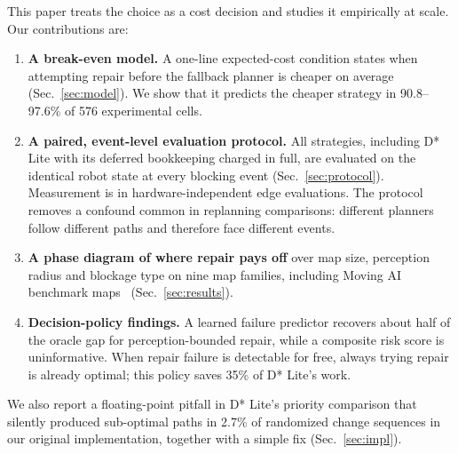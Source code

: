 \documentclass[11pt,a4paper]{article}
\begin{document}
This paper treats the choice as a cost decision and studies it empirically at scale. Our contributions are:
\begin{enumerate}
  \item \textbf{A break-even model.} A one-line expected-cost condition states when attempting repair before the fallback planner is cheaper on average (Sec.~\ref{sec:model}). We show that it predicts the cheaper strategy in 90.8--97.6\% of 576 experimental cells.
  \item \textbf{A paired, event-level evaluation protocol.} All strategies, including D* Lite with its deferred bookkeeping charged in full, are evaluated on the identical robot state at every blocking event (Sec.~\ref{sec:protocol}). Measurement is in hardware-independent edge evaluations. The protocol removes a confound common in replanning comparisons: different planners follow different paths and therefore face different events.
  \item \textbf{A phase diagram of where repair pays off} over map size, perception radius and blockage type on nine map families, including Moving AI benchmark maps~\cite{sturtevant2012} (Sec.~\ref{sec:results}).
  \item \textbf{Decision-policy findings.} A learned failure predictor recovers about half of the oracle gap for perception-bounded repair, while a composite risk score is uninformative. When repair failure is detectable for free, always trying repair is already optimal; this policy saves 35\% of D* Lite's work.
\end{enumerate}
We also report a floating-point pitfall in D* Lite's priority comparison that silently produced sub-optimal paths in 2.7\% of randomized change sequences in our original implementation, together with a simple fix (Sec.~\ref{sec:impl}).

\end{document}
